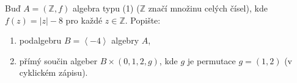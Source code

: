 \subsubsection{}
Buď $A=(\mathbb{Z},f)$ algebra typu (1) ($\mathbb{Z}$ značí množinu celých
čísel), kde $f(z) = |z| -8$ pro každé $z \in \mathbb{Z}$. Popište:

\begin{enumerate}
  \item podalgebru $B = \left \langle  {-4} \right \rangle$ algebry $A$,
  \item přímý součin algeber $B \times ({0,1,2}, g)$, kde $g$ je permutace
  $g=(1,2)$ (v cyklickém zápisu).
\end{enumerate}
